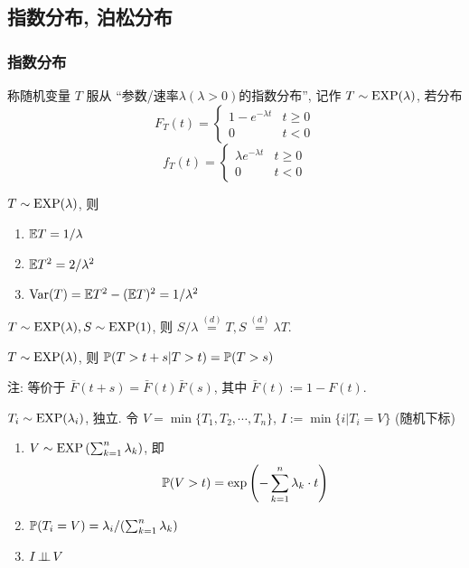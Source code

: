 \subsection{指数分布, 泊松分布}

\subsubsection{指数分布}

\begin{definition}[指数分布]
    称随机变量 $T$ 服从 ``参数/速率$\lambda(\lambda>0)$的指数分布'', 记作 $T\sim \operatorname{EXP}(\lambda)$, 若分布
    \begin{equation}
        F_T(t)=\begin{cases}
            1-e^{-\lambda t} & t\geq 0\\
            0 & t<0
        \end{cases}
    \end{equation}
    \begin{equation}
        f_T(t)=\begin{cases}
            \lambda e^{-\lambda t} & t\geq 0\\
            0 & t<0
        \end{cases}
    \end{equation}
\end{definition}

\begin{property}[矩]
$T\sim \operatorname{EXP}(\lambda)$, 则
\begin{enumerate}
    \item $\mathbb E T=1/\lambda$
    \item $\mathbb E T^2=2/\lambda^2$
    \item $\operatorname{Var}(T)=\mathbb E T^2-(\mathbb E T)^2=1/\lambda^2$
\end{enumerate}
\end{property}

\begin{property}[Scaling]
$T\sim \operatorname{EXP}(\lambda), S\sim \operatorname{EXP}(1)$, 则 $S/\lambda\overset{(d)}{=}T, S\overset{(d)}{=}\lambda T$.
\end{property}

\begin{property}[无记忆性]
$T\sim \operatorname{EXP}(\lambda)$, 则 $\mathbb{P}(T>t+s|T>t)=\mathbb{P}(T>s)$

注: 等价于 $\bar{F}(t+s)=\bar{F}(t)\bar{F}(s)$, 其中 $\bar{F}(t):=1-F(t)$.
\end{property}

\begin{property}[指数分布的排序]
$T_i\sim \operatorname{EXP}(\lambda_i)$, 独立. 令 $V=\min\{T_1,T_2,\cdots,T_n\}$, $I:=\min\{i|T_i=V\}$ (随机下标)
\begin{enumerate}
    \item $V\sim \operatorname{EXP}\left(\sum_{k=1}^n\lambda_k\right)$, 即
    \begin{equation}
		\mathbb{P}(V>t)=\exp\left(-\sum_{k=1}^n\lambda_k \cdot t\right)
		\end{equation}
    \item $\mathbb{P}(T_i=V)=\lambda_i/(\sum_{k=1}^n\lambda_k)$
    \item $I\operatorname{\perp\!\!\!\perp} V$
\end{enumerate}
\end{property}

